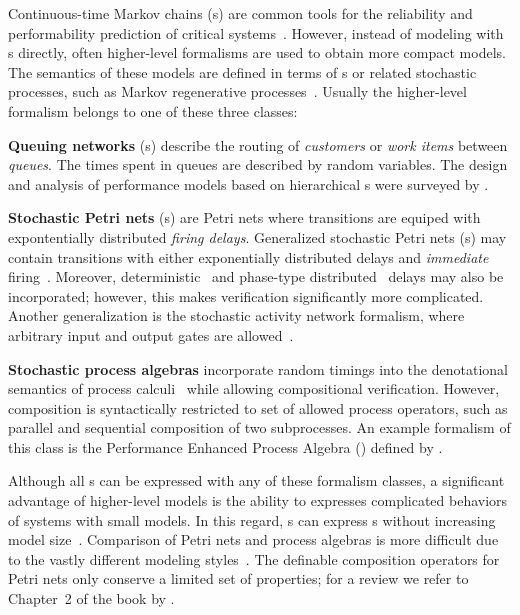 Continuous-time Markov chains (s) are common tools for the reliability and performability prediction of critical systems~. However, instead of modeling with s directly, often higher-level formalisms are used to obtain more compact models. The semantics of these models are defined in terms of s or related stochastic processes, such as Markov regenerative processes~\citep{Logothetis95mrm,Telek96mrm}. Usually the higher-level formalism belongs to one of these three classes:

\newpara \textbf{Queuing networks} (s) describe the routing of \emph{customers} or \emph{work items} between \emph{queues}. The times spent in queues are described by random variables. The design and analysis of performance models based on hierarchical s were surveyed by \citet{Smith11interoperability}.

\newpara \textbf{Stochastic Petri nets} (s) are Petri nets where transitions are equiped with expontentially distributed \emph{firing delays}. Generalized stochastic Petri nets (s) may contain transitions with either exponentially distributed delays and \emph{immediate} firing~\citep{Marsan84gspn}. Moreover, deterministic~\citep{Logothetis95mrm} and phase-type distributed~\citep{Longo13phasetype} delays may also be incorporated; however, this makes verification significantly more complicated. Another generalization is the stochastic activity network formalism, where arbitrary input and output gates are allowed~\citep{Sanders01san}.

\newpara \textbf{Stochastic process algebras} incorporate random timings into the denotational semantics of process calculi~\citep{Hermanns02algebra} while allowing compositional verification. However, composition is syntactically restricted to set of allowed process operators, such as parallel and sequential composition of two subprocesses. An example formalism of this class is the Performance Enhanced Process Algebra () defined by \citet{Hillston95pepa}.

\newpara Although all s can be expressed with any of these formalism classes, a significant advantage of higher-level models is the ability to expresses complicated behaviors of systems with small models. In this regard, s can express s without increasing model size~\citep{Vernon86comparison}. Comparison of Petri nets and process algebras is more difficult due to the vastly different modeling styles~\citep{Donatelli95comparison}. The definable composition operators for Petri nets only conserve a limited set of properties; for a review we refer to Chapter~2 of the book by \citet{Hejiao12pppnpa}.

